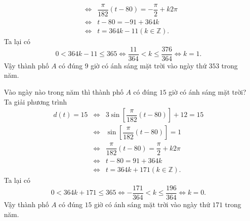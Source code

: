 \begin{bt}
{\begin{listEX}[1]
\begin{eqnarray*}
				&\Leftrightarrow& \dfrac{\pi}{182}(t-80) =-\dfrac{\pi}{2}+k2 \pi \\
				&\Leftrightarrow& t-80 = -91+364k\\
				&\Leftrightarrow& t= 364k-11 (k\in \mathbb{Z}).	
			\end{eqnarray*}
			Ta lại có  \[0<364k-11 \le 365 \Leftrightarrow \dfrac{11}{364}<k \le \dfrac{376}{364} \Leftrightarrow k=1.\]
			Vậy thành phố $A$ có đúng $9$ giờ có ánh sáng mặt trời vào ngày thứ $353$ trong năm.
			\item Vào ngày nào trong năm thì thành phố $A$ có đúng $15$ giờ có ánh sáng mặt trời?
			Ta giải phương trình 
			\begin{eqnarray*}
				d(t)=15 &\Leftrightarrow& 3\sin\left[\dfrac{\pi}{182}(t-80)\right] +12=15 \\
				&\Leftrightarrow& \sin\left[\dfrac{\pi}{182}(t-80)\right]=1\\
				&\Leftrightarrow& \dfrac{\pi}{182}(t-80) =\dfrac{\pi}{2}+k2 \pi \\
				&\Leftrightarrow& t-80 = 91+364k\\
				&\Leftrightarrow& t= 364k+171 (k\in \mathbb{Z}).	
			\end{eqnarray*}
			Ta lại có  \[0<364k+171 \le 365 \Leftrightarrow -\dfrac{171}{364}<k \le \dfrac{196}{364} \Leftrightarrow k=0.\]
			Vậy thành phố $A$ có đúng $15$ giờ có ánh sáng mặt trời vào ngày thứ $171$ trong năm.
		\end{listEX}
	}
\end{bt}

